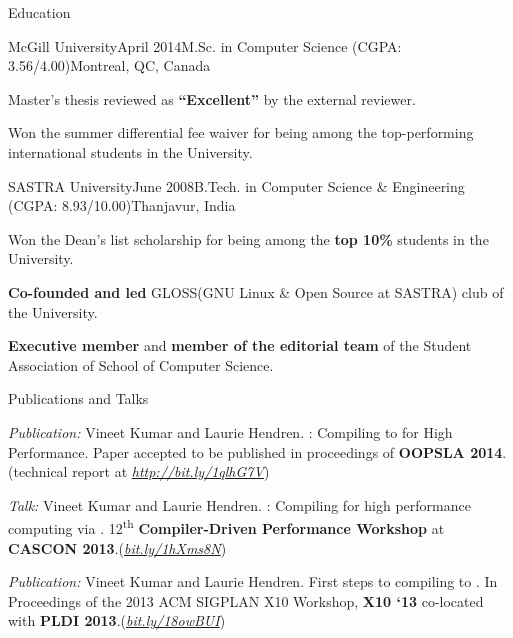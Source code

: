 \documentclass{resume} %
\begin{document}
\begin{rSection}{Education}

\begin{rSubsection}{McGill University}{April 2014}{M.Sc. in
Computer Science (CGPA: 3.56/4.00)}{Montreal, QC, Canada} 
\item Master's thesis reviewed as \textbf{``Excellent''} by the external
reviewer.
\item Won the {summer differential fee waiver} for being among the
top-performing international students in the University.  
\end{rSubsection}

\begin{rSubsection}{SASTRA University}{June 2008}{B.Tech. in Computer Science
\& Engineering (CGPA: 8.93/10.00)}{Thanjavur, India} 
\item Won the {Dean's list scholarship} for being among the \textbf{top
10\%} students in the University. 
\item \textbf{Co-founded and led} GLOSS(GNU Linux \& Open Source at SASTRA)
club of the University.  
\item \textbf{Executive member} and \textbf{member of the editorial team} of
the Student Association of School of Computer Science. 
\end{rSubsection}

\end{rSection}


\begin{rSection}{Publications and Talks}
\smallskip
\begin{lSubsection}


\item \emph{Publication:} Vineet Kumar and Laurie Hendren. \mixten:
  Compiling \matlab to \xten for High Performance. Paper accepted to be
  published in proceedings of \textbf{OOPSLA 2014}.(technical report at
  \href{http://bit.ly/1qlhG7V}{\em{http://bit.ly/1qlhG7V}})

\item \emph{Talk:} Vineet Kumar and Laurie Hendren. \mixten: Compiling \matlab
  for high performance computing via \xten. 12\textsuperscript{th}
  \textbf{Compiler-Driven Performance Workshop} at \textbf{CASCON
  2013}.(\href{http://webdocs.cs.ualberta.ca/~amaral/cascon/CDP13/#VinetKumar}{\em{bit.ly/1hXms8N}}) 

\item \emph{Publication:} Vineet Kumar and Laurie Hendren. First steps to
compiling \matlab to \xten. In Proceedings of the 2013 ACM SIGPLAN X10
Workshop, \textbf{X10 `13} co-located with \textbf{PLDI
2013}.(\href{http://www.sable.mcgill.ca/mclab/mix10/paper.pdf}{\em{bit.ly/18owBUI}})
\end{lSubsection}
\end{rSection}
\end{document}
